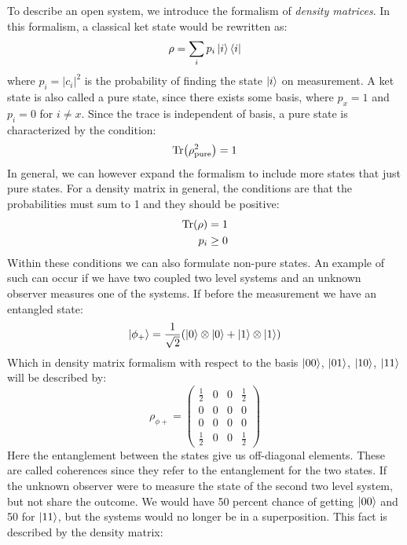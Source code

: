 To describe an open system, we introduce the formalism of \textit{density matrices}. In this formalism, a classical ket state would be rewritten as:
\begin{equation}
    \rho = \sum_i p_i \ket{i}\bra{i}
\end{equation}
where $p_i = |c_i|^2$ is the probability of finding the state $\ket{i}$ on measurement. A ket state is also called a pure state, since there exists some basis, where $p_x = 1$ and $p_i = 0$ for $i\neq x$. Since the trace is independent of basis, a pure state is characterized by the condition:
\begin{equation}
    \Tr(\rho_{\text{pure}}^2) = 1
\end{equation}
In general, we can however expand the formalism to include more states that just pure states. For a density matrix in general, the conditions are that the probabilities must sum to 1 and they should be positive:
\begin{align}
    \Tr(\rho) &= 1 \\
    p_i &\geq 0
\end{align}
Within these conditions we can also formulate non-pure states. An example of such can occur if we have two coupled two level systems and an unknown observer measures one of the systems. If before the measurement we have an entangled state:
\begin{equation}\label{eq:phi_plus}
    \ket{\phi_+} = \frac{1}{\sqrt{2}}(\ket{0}\otimes \ket{0} + \ket{1}\otimes\ket{1})
\end{equation}
Which in density matrix formalism with respect to the basis $\ket{00}$, $\ket{01}$, $\ket{10}$, $\ket{11}$ will be described by:
\begin{equation}
    \rho_{\phi+} = 
    \begin{pmatrix}
        \frac{1}{2} & 0 & 0 & \frac{1}{2} \\
        0 & 0 & 0 & 0 \\
        0 & 0 & 0 & 0 \\
        \frac{1}{2} & 0 & 0 & \frac{1}{2}
    \end{pmatrix}
\end{equation}
Here the entanglement between the states give us off-diagonal elements. These are called coherences since they refer to the entanglement for the two states. If the unknown observer were to measure the state of the second two level system, but not share the outcome. We would have 50 percent chance of getting $\ket{00}$ and 50 for $\ket{11}$, but the systems would no longer be in a superposition. This fact is described by the density matrix: 
